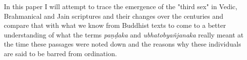 In this paper I will attempt to trace the emergence of the "third sex" in Vedic, Brahmanical and Jain scriptures and their changes over the centuries and compare that with what we know from Buddhist texts to come to a better understanding of what the terms {\em paṇḍaka} and {\em ubhatob­yañ­janaka} really meant at the time these passages were noted down and the reasons why these individuals are said to be barred from ordination.